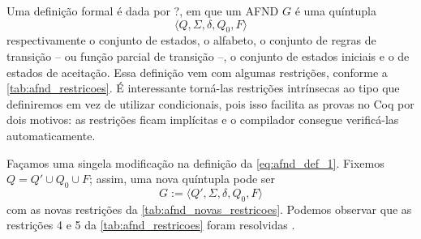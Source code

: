 Uma definição formal é dada por ?, em que um AFND $G$ é uma quíntupla \begin{equation}
  \label{eq:afnd_def_1}
  \langle Q, \Sigma, \delta, Q_0, F \rangle
\end{equation} respectivamente o conjunto de estados, o alfabeto, o conjunto de regras de transição -- ou função parcial de transição --, o conjunto de estados iniciais e o de estados de aceitação. Essa definição vem com algumas restrições, conforme a \autoref{tab:afnd_restricoes}. É interessante torná-las restrições intrínsecas ao tipo que definiremos em vez de utilizar condicionais, pois isso facilita as provas no Coq por dois motivos: as restrições ficam implícitas e o compilador consegue verificá-las automaticamente.


Façamos uma singela modificação na definição da \autoref{eq:afnd_def_1}. Fixemos $Q = Q' \cup Q_0 \cup F$; assim, uma nova quíntupla pode ser \begin{equation}
  \label{eq:afnd_def_2}
  G := \langle Q', \Sigma, \delta, Q_0, F \rangle
\end{equation} com as novas restrições da \autoref{tab:afnd_novas_restricoes}. Podemos observar que as restrições 4 e 5 da \autoref{tab:afnd_restricoes} foram resolvidas .

